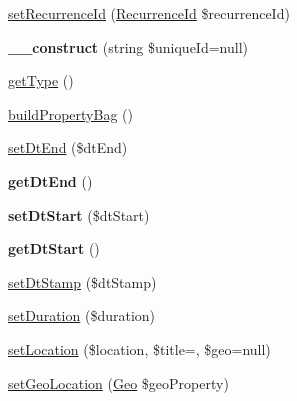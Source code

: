 \begin{DoxyCompactItemize}
\item 
\mbox{\hyperlink{class_eluceo_1_1i_cal_1_1_component_1_1_event_a58f917ab89985fa449ad2cff85477d0a}{set\+Recurrence\+Id}} (\mbox{\hyperlink{class_eluceo_1_1i_cal_1_1_property_1_1_event_1_1_recurrence_id}{Recurrence\+Id}} \$recurrence\+Id)
\item 
\mbox{\label{class_eluceo_1_1i_cal_1_1_component_1_1_event_aef22cbf45d882cfdf42290b5a70b50d4}} 
{\bfseries \+\_\+\+\_\+construct} (string \$unique\+Id=null)
\item 
\mbox{\hyperlink{class_eluceo_1_1i_cal_1_1_component_1_1_event_a705569387e533a6530b6696f3f157337}{get\+Type}} ()
\item 
\mbox{\hyperlink{class_eluceo_1_1i_cal_1_1_component_1_1_event_af5012821fe765f4901f9e18cdc0c33c5}{build\+Property\+Bag}} ()
\item 
\mbox{\hyperlink{class_eluceo_1_1i_cal_1_1_component_1_1_event_a89e2bf9ddc7f1ea8f4ddce0d287d0b6e}{set\+Dt\+End}} (\$dt\+End)
\item 
\mbox{\label{class_eluceo_1_1i_cal_1_1_component_1_1_event_a49fbe4c0f59c7a8bb28f8e417c64120a}} 
{\bfseries get\+Dt\+End} ()
\item 
\mbox{\label{class_eluceo_1_1i_cal_1_1_component_1_1_event_a4a0ac3f8c1c18435b67c7be2474c0ed1}} 
{\bfseries set\+Dt\+Start} (\$dt\+Start)
\item 
\mbox{\label{class_eluceo_1_1i_cal_1_1_component_1_1_event_a68e770ea9835241b33a10b5833edf50e}} 
{\bfseries get\+Dt\+Start} ()
\item 
\mbox{\hyperlink{class_eluceo_1_1i_cal_1_1_component_1_1_event_a395b6bc368752cb4f2dbe0fac3b4bc8f}{set\+Dt\+Stamp}} (\$dt\+Stamp)
\item 
\mbox{\hyperlink{class_eluceo_1_1i_cal_1_1_component_1_1_event_aaa4ee424e98d66778e0af4c7c0e4994f}{set\+Duration}} (\$duration)
\item 
\mbox{\hyperlink{class_eluceo_1_1i_cal_1_1_component_1_1_event_a44f4216a540e32fe3d18015e24bc40b5}{set\+Location}} (\$location, \$title=\textquotesingle{}\textquotesingle{}, \$geo=null)
\item 
\mbox{\hyperlink{class_eluceo_1_1i_cal_1_1_component_1_1_event_a7dcac1158135e60a3dd6422ec8c480c3}{set\+Geo\+Location}} (\mbox{\hyperlink{class_eluceo_1_1i_cal_1_1_property_1_1_event_1_1_geo}{Geo}} \$geo\+Property)

\end{DoxyCompactItemize}
